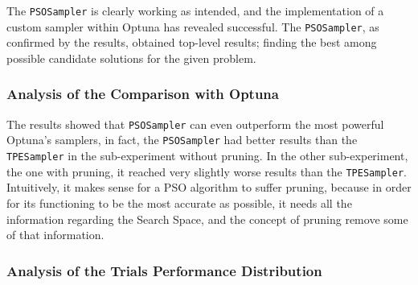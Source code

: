 The \texttt{PSOSampler} is clearly working as intended, and the implementation of a custom sampler within Optuna has revealed successful.
The \texttt{PSOSampler}, as confirmed by the results, obtained top-level results; finding the best among possible candidate solutions for the given problem.

\subsubsection{Analysis of the Comparison with Optuna}

The results showed that \texttt{PSOSampler} can even outperform the most powerful Optuna's samplers, in fact, the \texttt{PSOSampler} had better results than the \texttt{TPESampler} in the sub-experiment without pruning.
In the other sub-experiment, the one with pruning, it reached very slightly worse results than the \texttt{TPESampler}. Intuitively, it makes sense for a PSO algorithm to suffer pruning, because in order for its functioning to be the most accurate as possible, it needs all the information regarding the Search Space, and the concept of pruning remove some of that information.

\subsubsection{Analysis of the Trials Performance Distribution}

